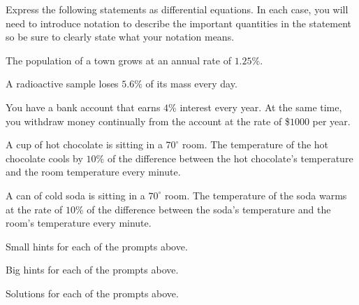 \begin{activity} \label{A:6.6.1}  Express the following statements as   differential equations.  In each case, you will need to introduce notation to describe the important quantities in the statement so be sure to clearly state what your notation means.
\ba
	\item The population of a town grows at an annual rate of $1.25$\%. 
        \item A radioactive sample loses $5.6$\% of its mass every day.
        \item You have a bank account that earns $4$\% interest every year.  At the same time, you withdraw money continually from the account at the rate of \$$1000$ per year.
        \item A cup of hot chocolate is sitting in a $70^\circ$ room. The temperature of the hot chocolate cools by $10$\% of the difference between the hot chocolate's temperature and the room temperature every minute.
        \item A can of cold soda is sitting in a $70^\circ$ room. The temperature of the soda warms at the rate of $10$\% of the difference between the soda's temperature and the room's temperature every minute.
\ea
\end{activity}
\begin{smallhint}
\ba
	\item Small hints for each of the prompts above.
\ea
\end{smallhint}
\begin{bighint}
\ba
	\item Big hints for each of the prompts above.
\ea
\end{bighint}
\begin{activitySolution}
\ba
	\item Solutions for each of the prompts above.
\ea
\end{activitySolution}
\aftera